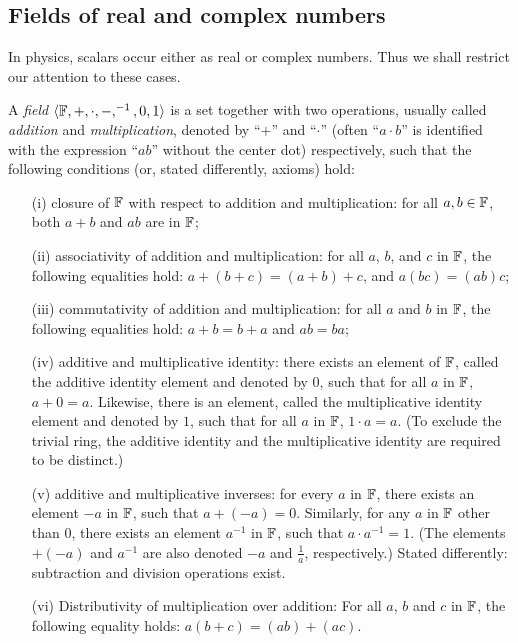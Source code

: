 \subsection{Fields of real and complex numbers}

In physics, scalars occur either as real or complex numbers.
Thus we shall restrict our attention to these cases.

A {\em field}  $\langle  {\Bbb F} , +, \cdot , -, ^{-1}, 0, 1\rangle$
is a set together with two operations,
usually called {\em addition} and {\em multiplication},   denoted by ``$+$'' and ``$\cdot$''
(often  ``$a\cdot b$'' is identified with the expression ``$ab$'' without the center dot)
respectively, such that the following conditions (or, stated differently, axioms) hold:
\begin{itemize}
\item[(i)]
closure of ${\Bbb F}$ with respect to addition and multiplication:
for all $a, b \in {\Bbb F}$, both $a + b$ and $a   b$ are in ${\Bbb F}$;
\item[(ii)]
associativity of addition and multiplication:
for all $a$, $b$, and $c$ in ${\Bbb F}$,
the following equalities hold: $a + (b + c) = (a + b) + c$,
and
$a (b c) = (a  b) c$;
\item[(iii)]
commutativity of addition and multiplication:
for all $a$ and $b$ in ${\Bbb F}$, the following equalities hold: $a + b = b + a$ and $a b = b  a$;
\item[(iv)]
additive and multiplicative identity:
there exists an element of ${\Bbb F}$,
called the additive identity element and denoted by $0$, such that for all $a$ in ${\Bbb F}$,
$a + 0 = a$.
Likewise, there is an element, called the multiplicative identity element and denoted by $1$,
such that for all $a$ in ${\Bbb F}$, $1 \cdot a  = a$.
(To exclude the trivial ring, the additive identity and the multiplicative
identity are required to be distinct.)
\item[(v)]
additive and multiplicative inverses:
for every $a$ in ${\Bbb F}$, there exists an element $-a$ in ${\Bbb F}$, such that $a + (-a) = 0$.
Similarly, for any $a$ in ${\Bbb F}$ other than $0$, there exists an element $a^{-1}$ in ${\Bbb F}$,
such that $a \cdot a^{-1} = 1$.
(The elements $+ (-a)$ and  $a^{-1}$
are also denoted $-a$ and $\frac{1}{a}$, respectively.)
Stated differently: subtraction and division operations exist.
\item[(vi)]
Distributivity of multiplication over addition:
For all $a$, $b$ and $c$ in ${\Bbb F}$, the following equality holds:
$a (b + c) = (a  b) + (a  c)$.
\end{itemize}

